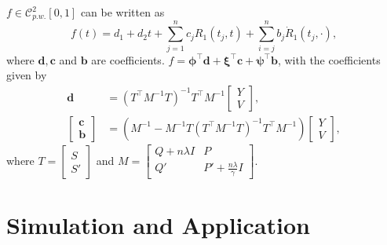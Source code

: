 \documentclass{beamer}
\begin{document}

\begin{frame}
$f \in \mathcal{C}_{p.w.}^2[0,1]$ can be written as
\begin{equation}\label{etaeq}
f(t)=d_1+d_2t+\sum_{j=1}^{n}c_jR_1(t_j,t)+\sum_{i=j}^{n}b_j\dot{R}_1(t_j,\cdot),
\end{equation}
where $\mathbf{d},\mathbf{c}$ and $\mathbf{b}$ are coefficients. 
 $f= \mathbf{\phi}^\top \mathbf{d}+\mathbf{\xi}^\top \mathbf{c}+\mathbf{\psi}^\top \mathbf{b}$, with the coefficients given by
\begin{align*}
\mathbf{d}&=(T^\top M^{-1}T)^{-1}T^\top M^{-1}\begin{bmatrix}Y\\V \end{bmatrix},\\
\begin{bmatrix}\mathbf{c}\\\mathbf{b}\end{bmatrix} &=
(M^{-1}-M^{-1}T(T^\top M^{-1} T)^{-1}T^\top M^{-1})\begin{bmatrix}Y\\V \end{bmatrix},
\end{align*} where $T=\begin{bmatrix} S\\S' \end{bmatrix}$ and $M=\begin{bmatrix}
Q+n\lambda I& P\\
Q'& P'+\frac{n\lambda}{\gamma}I
\end{bmatrix}$.
\end{frame}


\section{Simulation and Application}
\end{document}
